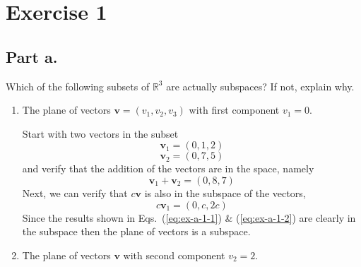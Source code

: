 \section{Exercise 1}
\subsection{Part a.}
Which of the following subsets of $\mathbb{R}^{3}$ are actually subspaces?
If not, explain why.
\begin{enumerate}[label=(\arabic*)]
    \item The plane of vectors $\mathbf{v} = (v_{1}, v_{2}, v_{3})$ with
        first component $v_{1}=0$.
        \newline
        \begin{mdframed}[style=MyFrame]
        Start with two vectors in the subset 
        \begin{equation}
            \mathbf{v}_{1} =  (0,1,2)
        \end{equation}
        \begin{equation}
            \mathbf{v}_{2} =  (0,7,5)
        \end{equation}
        and verify that the addition of the vectors are in the space,
        namely
        \begin{equation}
            \mathbf{v}_{1} + \mathbf{v}_{2} = (0,8,7)
            \label{eq:ex-a-1-1}
        \end{equation}
        Next, we can verify that $c\mathbf{v}$ is also in the subspace of
        the vectors,
        \begin{equation}
            c\mathbf{v}_{1} =  (0,c,2c)
            \label{eq:ex-a-1-2}
        \end{equation}
            Since the results shown in Eqs.~(\ref{eq:ex-a-1-1}) \&
            (\ref{eq:ex-a-1-2}) are clearly in the subspace then the plane
            of vectors is a subspace.
        \end{mdframed}
    \item The plane of vectors $\mathbf{v}$ with second component $v_{2}=2$.

\end{enumerate}
